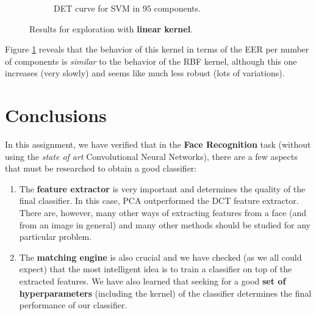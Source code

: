 \documentclass[a4paper]{article}
\begin{document}
\begin{enumerate}
\begin{figure}[H]
\begin{subfigure}[t]{0.45\textwidth}
         \caption{DET curve for SVM in \(95\) components.}
     \end{subfigure}
    \caption{Results for exploration with \textbf{linear kernel}.}
    \label{fig:extra:linear:all}
\end{figure}

Figure \ref{fig:extra:linear:all} reveals that the behavior of this kernel in terms of the EER per number of components is \emph{similar} to the behavior of the RBF kernel, although this one increases (very slowly) and seems like much less robust (lots of variations).

\end{enumerate}


\section{Conclusions}

In this assignment, we have verified that in the \textbf{Face Recognition} task (without using the \emph{state of art} Convolutional Neural Networks), there are a few aspects that must be researched to obtain a good classifier:

\begin{enumerate}
\item The \textbf{feature extractor} is very important and determines the quality of the final classifier. In this case, PCA outperformed the DCT feature extractor. There are, however, many other ways of extracting features from a face (and from an image in general) and many other methods should be studied for any particular problem.

\item The \textbf{matching engine} is also crucial and we have checked (as we all could expect) that the most intelligent idea is to train a classifier on top of the extracted features. We have also learned that seeking for a good \textbf{set of hyperparameters} (including the kernel) of the classifier determines the final performance of our classifier.
\end{enumerate}
\end{document}
